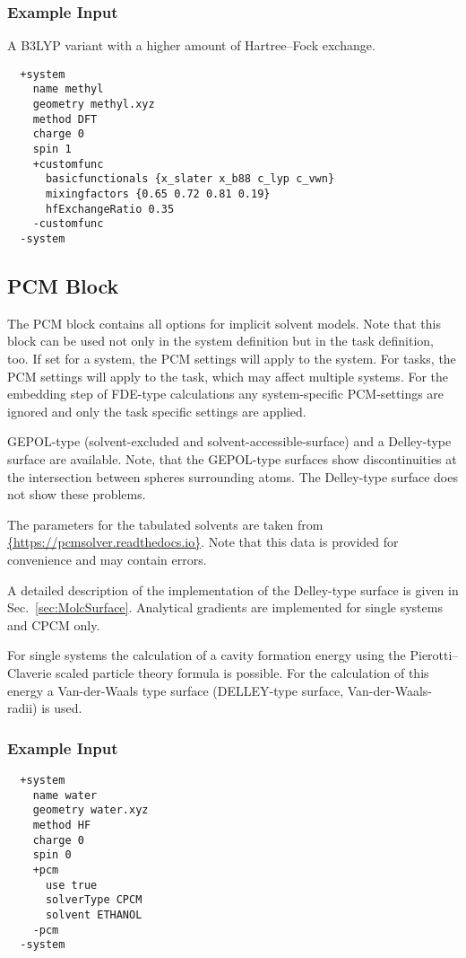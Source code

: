 \subsubsection{Example Input}
A B3LYP variant with a higher amount of Hartree--Fock exchange.
\begin{lstlisting}
  +system
    name methyl
    geometry methyl.xyz
    method DFT
    charge 0
    spin 1
    +customfunc
      basicfunctionals {x_slater x_b88 c_lyp c_vwn}
      mixingfactors {0.65 0.72 0.81 0.19}
      hfExchangeRatio 0.35
    -customfunc
  -system
 \end{lstlisting}

\subsection{PCM Block}\label{sec:system:pcm}

The PCM block contains all options for implicit solvent models. Note that this block can
be used not only in the system definition but in the task definition, too. If set for
a system, the PCM settings will apply to the system. For tasks, the PCM settings will apply
to the task, which may affect multiple systems. For the embedding step of FDE-type
calculations any system-specific PCM-settings are ignored and only the task specific settings
are applied.

GEPOL-type \cite{Pascual-Ahuir1987} (solvent-excluded and solvent-accessible-surface) and
a Delley-type \cite{Delley2006} surface are available. Note, that the GEPOL-type surfaces
show discontinuities at the intersection between spheres surrounding atoms. The Delley-type
surface does not show these problems.

The parameters for the tabulated solvents are taken from
\url{{https://pcmsolver.readthedocs.io}}.
Note that this data is provided for convenience and may contain errors.

A detailed description of the implementation of the Delley-type surface is given in Sec.~\ref{sec:MolcSurface}.
Analytical gradients are implemented for single systems and CPCM only.

For single systems the calculation of a cavity formation energy using the Pierotti--Claverie scaled particle
theory formula \cite{langlet1988improvements} is possible. For the calculation of this energy a Van-der-Waals
type surface (DELLEY-type surface, Van-der-Waals-radii) is used.


\subsubsection{Example Input}
\begin{lstlisting}
  +system
    name water  
    geometry water.xyz
    method HF  
    charge 0
    spin 0
    +pcm 
      use true
      solverType CPCM 
      solvent ETHANOL
    -pcm 
  -system
 \end{lstlisting}
